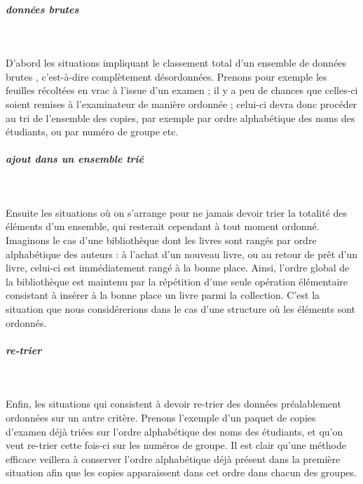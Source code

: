 \documentclass[11pt,a4paper]{article}
\begin{document}
            \par
        
			
		\subparagraph{donn\'ees \guillemotleft  brutes \guillemotright } 
		
					\textcolor{white}{.} \par
				
        D'abord les situations impliquant le classement total d'un ensemble de donn\'ees \guillemotleft  brutes \guillemotright , 
        c'est-\`a-dire compl\`etement d\'esordonn\'ees. Prenons pour exemple les feuilles r\'ecolt\'ees 
        en vrac \`a l'issue d'un examen ; il y a peu de chances que celles-ci soient remises \`a 
        l'examinateur de mani\`ere ordonn\'ee ; celui-ci devra donc proc\'eder au tri de l'ensemble 
        des copies, par exemple par ordre alphab\'etique des noms des \'etudiants, ou par num\'ero
        de groupe etc.
      
            \par
        
			
		\subparagraph{ajout dans un ensemble tri\'e} 
		
					\textcolor{white}{.} \par
				
		    Ensuite les situations o\`u on s'arrange pour ne jamais devoir trier la totalit\'e des \'el\'ements
        d'un ensemble, qui resterait cependant \`a tout moment ordonn\'e. Imaginons le cas d'une
        biblioth\`eque dont les livres sont rang\'es par ordre alphab\'etique des auteurs : \`a l'achat
        d'un nouveau livre, ou au retour de pr\^et d'un livre, celui-ci est imm\'ediatement rang\'e
        \`a la bonne place. Ainsi, l'ordre global de la biblioth\`eque est maintenu par la r\'ep\'etition
        d'une seule op\'eration \'el\'ementaire consistant \`a ins\'erer \`a la bonne place un livre parmi
        la collection. C'est la situation que nous consid\'ererions dans le cas d'une structure o\`u
        les \'el\'ements sont ordonn\'es.
      
            \par
        
			
		\subparagraph{re-trier} 
		
					\textcolor{white}{.} \par
				
        Enfin, les situations qui consistent \`a devoir re-trier des donn\'ees pr\'ealablement ordonn\'ees 
        sur un autre crit\`ere. Prenons l'exemple d'un paquet de copies d'examen d\'ej\`a tri\'ees
        sur l'ordre alphab\'etique des noms des \'etudiants, et qu'on veut re-trier cette fois-ci sur
        les num\'eros de groupe. Il est clair qu'une m\'ethode efficace veillera \`a conserver l'ordre
        alphab\'etique d\'ej\`a pr\'esent dans la premi\`ere situation afin que les copies apparaissent
        dans cet ordre dans chacun des groupes.
      
\end{document}
